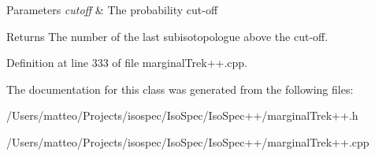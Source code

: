 \begin{DoxyParams}{Parameters}
{\em cutoff} & The probability cut-\/off \\
\hline
\end{DoxyParams}
\begin{DoxyReturn}{Returns}
The number of the last subisotopologue above the cut-\/off. 
\end{DoxyReturn}


Definition at line 333 of file marginal\+Trek++.\+cpp.



The documentation for this class was generated from the following files\+:\begin{DoxyCompactItemize}
\item 
/\+Users/matteo/\+Projects/isospec/\+Iso\+Spec/\+Iso\+Spec++/marginal\+Trek++.\+h\item 
/\+Users/matteo/\+Projects/isospec/\+Iso\+Spec/\+Iso\+Spec++/marginal\+Trek++.\+cpp\end{DoxyCompactItemize}
